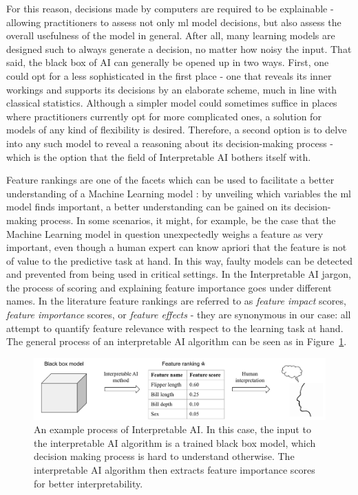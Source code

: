\documentclass{article}
\begin{document}
For this reason, decisions made by computers are required to be explainable - allowing practitioners to assess not only \gls{ml} model decisions, but also assess the overall usefulness of the model in general. After all, many learning models are designed such to always generate a decision, no matter how noisy the input. That said, the black box of AI can generally be opened up in two ways. First, one could opt for a less sophisticated in the first place - one that reveals its inner workings and supports its decisions by an elaborate scheme, much in line with classical statistics. Although a simpler model could sometimes suffice in places where practitioners currently opt for more complicated ones, a solution for models of any kind of flexibility is desired. Therefore, a second option is to delve into any such model to reveal a reasoning about its decision-making process - which is the option that the field of Interpretable AI bothers itself with.

Feature rankings are one of the facets which can be used to facilitate a better understanding of a Machine Learning model \citep{hansen_interpretability_2019}: by unveiling which variables the \gls{ml} model finds important, a better understanding can be gained on its decision-making process. In some scenarios, it might, for example, be the case that the Machine Learning model in question unexpectedly weighs a feature as very important, even though a human expert can know apriori that the feature is not of value to the predictive task at hand. In this way, faulty models can be detected and prevented from being used in critical settings. In the Interpretable AI jargon, the process of scoring and explaining feature importance goes under different names. In the literature feature rankings are referred to as \textit{feature impact} scores, \textit{feature importance} scores, or \textit{feature effects} - they are synonymous in our case: all attempt to quantify feature relevance with respect to the learning task at hand. The general process of an interpretable AI algorithm can be seen as in Figure~\ref{fig:schematic-interpretable-ai}.

\begin{figure}[ht]
    \centering
    \includegraphics[width=\linewidth]{report/images/schematic-interpretable-ai.pdf}
    \caption{An example process of Interpretable AI. In this case, the input to the interpretable AI algorithm is a trained black box model, which decision making process is hard to understand otherwise. The interpretable AI algorithm then extracts feature importance scores for better interpretability.}
    \label{fig:schematic-interpretable-ai}
\end{figure}
\end{document}
